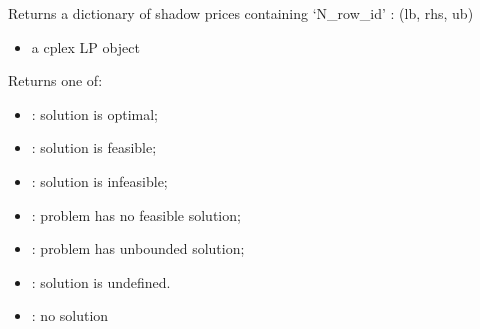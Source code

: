 \documentclass[letterpaper,10pt,english]{sphinxmanual}
\begin{document}

\begin{fulllineitems}
\label{\detokenize{modules_doc:cbmpy.CBCPLEX.cplx_getShadowPrices}}
\pysigstartsignatures
{}
\pysigstopsignatures
\sphinxAtStartPar
Returns a dictionary of shadow prices containing ‘N\_row\_id’ : (lb, rhs, ub)
\begin{itemize}
\item {} 
\sphinxAtStartPar
{} a cplex LP object

\end{itemize}

\end{fulllineitems}


\begin{fulllineitems}
\label{\detokenize{modules_doc:cbmpy.CBCPLEX.cplx_getSolutionStatus}}
\pysigstartsignatures
{}
\pysigstopsignatures
\sphinxAtStartPar
Returns one of:
\begin{itemize}
\item {} 
\sphinxAtStartPar
{}: solution is optimal;

\item {} 
\sphinxAtStartPar
{}: solution is feasible;

\item {} 
\sphinxAtStartPar
{}: solution is infeasible;

\item {} 
\sphinxAtStartPar
{}: problem has no feasible solution;

\item {} 
\sphinxAtStartPar
{}: problem has unbounded solution;

\item {} 
\sphinxAtStartPar
{}: solution is undefined.

\item {} 
\sphinxAtStartPar
{}: no solution

\end{itemize}

\end{fulllineitems}
\end{document}
